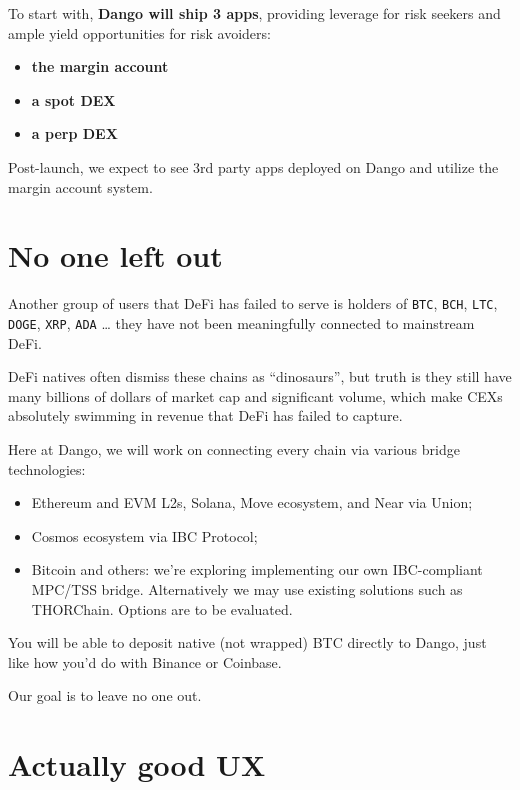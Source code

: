\documentclass{article}
\newcommand{\image}[2]{%
  \begin{center}
    \makebox[\textwidth]{ \texttt{[image: \#1]}}%
  \end{center}
  \begin{center}
    \captionsetup{type=figure}
    \captionof{figure}{#2}
  \end{center}
}
\begin{document}
To start with, \textbf{Dango will ship 3 apps}, providing leverage for risk seekers and ample yield opportunities for risk avoiders:

\begin{itemize}
  \item \textbf{the margin account}
  \item \textbf{a spot DEX}
  \item \textbf{a perp DEX}
\end{itemize}

Post-launch, we expect to see 3rd party apps deployed on Dango and utilize the margin account system.

\section{No one left out}

Another group of users that DeFi has failed to serve is holders of \texttt{BTC}, \texttt{BCH}, \texttt{LTC}, \texttt{DOGE}, \texttt{XRP}, \texttt{ADA} … they have not been meaningfully connected to mainstream DeFi.

\image{images/3-bridging.jpeg}{Bridging}

DeFi natives often dismiss these chains as ``dinosaurs'', but truth is they still have many billions of dollars of market cap and significant volume, which make CEXs absolutely swimming in revenue that DeFi has failed to capture.

Here at Dango, we will work on connecting every chain via various bridge technologies:

\begin{itemize}
  \item Ethereum and EVM L2s, Solana, Move ecosystem, and Near via Union;\supercite{union}
  \item Cosmos ecosystem via IBC Protocol;\supercite{ibcprotocol}
  \item Bitcoin and others: we're exploring implementing our own IBC-compliant MPC/TSS bridge. Alternatively we may use existing solutions such as THORChain.\supercite{thorchain} Options are to be evaluated.
\end{itemize}

You will be able to deposit native (not wrapped) BTC directly to Dango, just like how you'd do with Binance or Coinbase.

Our goal is to leave no one out.

\section{Actually good UX}
\end{document}
